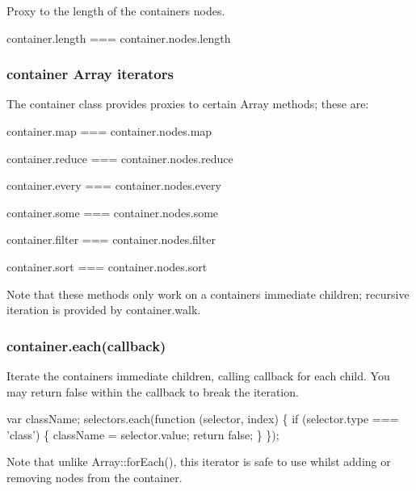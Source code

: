 Proxy to the length of the container\textquotesingle{}s nodes.


\begin{DoxyCode}
container.length === container.nodes.length
\end{DoxyCode}


\subsubsection*{{\ttfamily container} Array iterators}

The container class provides proxies to certain Array methods; these are\+:


\begin{DoxyItemize}
\item {\ttfamily container.\+map === container.\+nodes.\+map}
\item {\ttfamily container.\+reduce === container.\+nodes.\+reduce}
\item {\ttfamily container.\+every === container.\+nodes.\+every}
\item {\ttfamily container.\+some === container.\+nodes.\+some}
\item {\ttfamily container.\+filter === container.\+nodes.\+filter}
\item {\ttfamily container.\+sort === container.\+nodes.\+sort}
\end{DoxyItemize}

Note that these methods only work on a container\textquotesingle{}s immediate children; recursive iteration is provided by {\ttfamily container.\+walk}.

\subsubsection*{{\ttfamily container.\+each(callback)}}

Iterate the container\textquotesingle{}s immediate children, calling {\ttfamily callback} for each child. You may return {\ttfamily false} within the callback to break the iteration.


\begin{DoxyCode}
var className;
selectors.each(function (selector, index) \{
    if (selector.type === 'class') \{
        className = selector.value;
        return false;
    \}
\});
\end{DoxyCode}


Note that unlike {\ttfamily Array\+::for\+Each()}, this iterator is safe to use whilst adding or removing nodes from the container.

